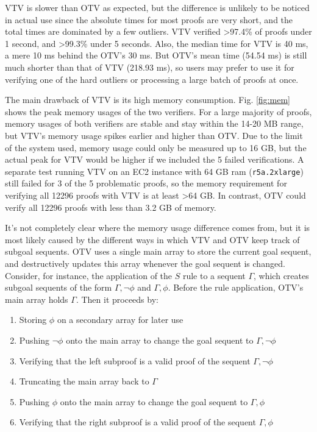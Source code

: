 \documentclass{lipics-v2021}
\begin{document}


VTV is slower than OTV as expected, but the difference is unlikely to be noticed 
in actual use since the absolute times for most proofs are very short, and the 
total times are dominated by a few outliers. 
VTV verified >97.4\% of proofs under 1 second, and >99.3\% under 5 seconds. 
Also, the median time for VTV is 40 ms, a mere 10 ms behind the OTV's 30 ms. 
But OTV's mean time (54.54 ms) is still much shorter than that of VTV (218.93 ms),
so users may prefer to use it for verifying one of the hard outliers or processing
a large batch of proofs at once.

The main drawback of VTV is its high memory consumption. Fig. \ref{fig:mem} shows
the peak memory usages of the two verifiers. For a large majority of proofs, 
memory usages of both verifiers are stable and stay within the 14-20 MB range,
but VTV's memory usage spikes earlier and higher than OTV. Due to the limit of the system 
used, memory usage could only be measured up to 16 GB, but the actual peak for VTV 
would be higher if we included the 5 failed verifications. A separate test running 
VTV on an EC2 instance with 64 GB ram (\texttt{r5a.2xlarge}) still failed for 3 of 
the 5 problematic proofs, so the memory requirement for verifying all 12296 proofs 
with VTV is at least >64 GB. In contrast, OTV could verify all 
12296 proofs with less than 3.2 GB of memory.



It's not completely clear where the memory usage difference comes from, but it is 
most likely caused by the different ways in which VTV and OTV keep track of 
subgoal sequents. OTV uses a single main array to store the current goal sequent,
and destructively updates this array whenever the goal sequent is changed. 
Consider, for instance, the application of the $S$ rule to a sequent $\Gamma$,
which creates subgoal sequents of the form $\Gamma, \lnot \phi$ and $\Gamma, \phi$. 
Before the rule application, OTV's main array holds $\Gamma$. Then it proceeds by:

\begin{enumerate}
  \item Storing $\phi$ on a secondary array for later use
  \item Pushing $\lnot \phi$ onto the main array to change the goal sequent to $\Gamma, \lnot \phi$
  \item Verifying that the left subproof is a valid proof of the sequent $\Gamma, \lnot \phi$
  \item Truncating the main array back to $\Gamma$ 
  \item Pushing $\phi$ onto the main array to change the goal sequent to $\Gamma, \phi$
  \item Verifying that the right subproof is a valid proof of the sequent $\Gamma, \phi$
\end{enumerate}
\end{document}
